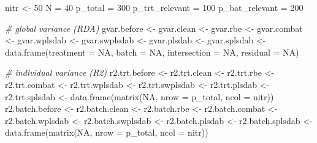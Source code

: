\documentclass[
]{book}
\newenvironment{Shaded}{\begin{snugshade}}{\end{snugshade}}
\newcommand{\AttributeTok}[1]{\textcolor[rgb]{0.77,0.63,0.00}{#1}}
\newcommand{\CommentTok}[1]{\textcolor[rgb]{0.56,0.35,0.01}{\textit{#1}}}
\newcommand{\ConstantTok}[1]{\textcolor[rgb]{0.00,0.00,0.00}{#1}}
\newcommand{\DecValTok}[1]{\textcolor[rgb]{0.00,0.00,0.81}{#1}}
\newcommand{\FunctionTok}[1]{\textcolor[rgb]{0.00,0.00,0.00}{#1}}
\newcommand{\NormalTok}[1]{#1}
\newcommand{\OtherTok}[1]{\textcolor[rgb]{0.56,0.35,0.01}{#1}}
\begin{document}
\begin{Shaded}
\begin{Highlighting}[]
\NormalTok{nitr }\OtherTok{\textless{}{-}} \DecValTok{50}
\NormalTok{N }\OtherTok{=} \DecValTok{40}
\NormalTok{p\_total }\OtherTok{=} \DecValTok{300}
\NormalTok{p\_trt\_relevant }\OtherTok{=} \DecValTok{100} 
\NormalTok{p\_bat\_relevant }\OtherTok{=} \DecValTok{200} 

\CommentTok{\# global variance (RDA)}
\NormalTok{gvar.before }\OtherTok{\textless{}{-}}\NormalTok{ gvar.clean }\OtherTok{\textless{}{-}} 
\NormalTok{  gvar.rbe }\OtherTok{\textless{}{-}}\NormalTok{ gvar.combat }\OtherTok{\textless{}{-}} 
\NormalTok{  gvar.wplsdab }\OtherTok{\textless{}{-}}\NormalTok{ gvar.swplsdab }\OtherTok{\textless{}{-}} 
\NormalTok{  gvar.plsdab }\OtherTok{\textless{}{-}}\NormalTok{ gvar.splsdab }\OtherTok{\textless{}{-}} \FunctionTok{data.frame}\NormalTok{(}\AttributeTok{treatment =} \ConstantTok{NA}\NormalTok{, }\AttributeTok{batch =} \ConstantTok{NA}\NormalTok{,  }
                                            \AttributeTok{intersection =} \ConstantTok{NA}\NormalTok{, }
                                            \AttributeTok{residual =} \ConstantTok{NA}\NormalTok{)}

\CommentTok{\# individual variance (R2)}
\NormalTok{r2.trt.before }\OtherTok{\textless{}{-}}\NormalTok{ r2.trt.clean }\OtherTok{\textless{}{-}} 
\NormalTok{  r2.trt.rbe  }\OtherTok{\textless{}{-}}\NormalTok{ r2.trt.combat }\OtherTok{\textless{}{-}} 
\NormalTok{  r2.trt.wplsdab }\OtherTok{\textless{}{-}}\NormalTok{ r2.trt.swplsdab }\OtherTok{\textless{}{-}}
\NormalTok{  r2.trt.plsdab }\OtherTok{\textless{}{-}}\NormalTok{ r2.trt.splsdab }\OtherTok{\textless{}{-}} \FunctionTok{data.frame}\NormalTok{(}\FunctionTok{matrix}\NormalTok{(}\ConstantTok{NA}\NormalTok{, }\AttributeTok{nrow =}\NormalTok{ p\_total, }
                                                       \AttributeTok{ncol =}\NormalTok{ nitr))}
\NormalTok{r2.batch.before }\OtherTok{\textless{}{-}}\NormalTok{ r2.batch.clean }\OtherTok{\textless{}{-}} 
\NormalTok{  r2.batch.rbe  }\OtherTok{\textless{}{-}}\NormalTok{ r2.batch.combat }\OtherTok{\textless{}{-}} 
\NormalTok{  r2.batch.wplsdab }\OtherTok{\textless{}{-}}\NormalTok{ r2.batch.swplsdab }\OtherTok{\textless{}{-}}
\NormalTok{  r2.batch.plsdab }\OtherTok{\textless{}{-}}\NormalTok{ r2.batch.splsdab }\OtherTok{\textless{}{-}} \FunctionTok{data.frame}\NormalTok{(}\FunctionTok{matrix}\NormalTok{(}\ConstantTok{NA}\NormalTok{, }\AttributeTok{nrow =}\NormalTok{ p\_total, }
                                                           \AttributeTok{ncol =}\NormalTok{ nitr))}


\end{Highlighting}
\end{Shaded}
\end{document}
